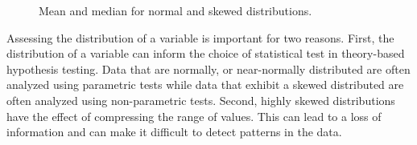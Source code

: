 \documentclass[
  letterpaper,
]{latex/krantz}
\theoremstyle{definition}
\theoremstyle{remark}
\begin{document}
\begin{figure}[H]
\begin{minipage}{0.33\linewidth}
{}


\end{minipage}%
%
\begin{minipage}{0.33\linewidth}



\end{minipage}%

\caption{\label{fig-aa-distributions}Mean and median for normal and
skewed distributions.}

\end{figure}%

Assessing the distribution of a variable is important for two reasons.
First, the distribution of a variable can inform the choice of
statistical test in theory-based hypothesis testing. Data that are
normally, or near-normally distributed are often analyzed using
parametric tests while data that exhibit a skewed distributed are often
analyzed using non-parametric tests. Second, highly skewed distributions
have the effect of compressing the range of values. This can lead to a
loss of information and can make it difficult to detect patterns in the
data.
\end{document}
